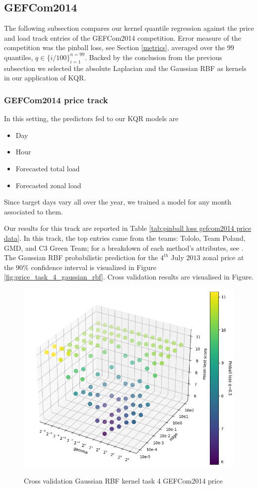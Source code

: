 \subsection{GEFCom2014}
The following subsection compares our kernel quantile regression against the price and load track entries of the GEFCom2014 competition.
Error measure of the competition was the pinball loss, see Section \ref{metrics}, averaged over the $99$ quantiles, $q \in \{i/100\}_{i=1}^{n=99}$. Backed by the conclusion from the previous subsection we selected the absolute Laplacian and the Gaussian RBF as kernels in our application of KQR.


\subsubsection{GEFCom2014 price track}
In this setting, the predictors fed to our KQR models are
\begin{itemize}
    \item Day
    \item Hour
    \item Forecasted total load
    \item Forecasted zonal load
\end{itemize}
Since target days vary all over the year, we trained a model for any month associated to them.

Our results for this track are reported in Table \ref{tab:pinball loss gefcom2014 price data}. In this track, the top entries came from the teams: Tololo, Team Poland, GMD, and C3 Green Team; for a breakdown of each method's attributes, see \cite[Table 8]{hong2016probabilistic}. 
The Gaussian RBF probabilistic prediction for the $4^{th}$ July $2013$ zonal price at the $90\%$ confidence interval is visualized in Figure \ref{fig:price_task_4_gaussian_rbf}.
Cross validation results are visualised in Figure.

\begin{figure}
    \includegraphics[width=\textwidth]{images/cv_scatter.png}
    \label{fig:cv_scatter}
    \caption{Cross validation Gaussian RBF kernel task 4 GEFCom2014 price}
\end{figure}



